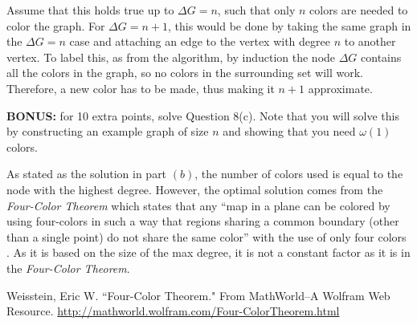 \documentclass[addpoints]{exam}
\begin{document}
\begin{questions}
\begin{solution}
Assume that this holds true up to $\Delta G = n$, such that only $n$ colors are needed to color the graph. For $\Delta G  = n+1$, this would be done by taking the same graph in the $\Delta G = n$ case and attaching an edge to the vertex with degree $n$ to another vertex. To label this, as from the algorithm, by induction the node $\Delta G$ contains all the colors in the graph, so no colors in the surrounding set will work. Therefore, a new color has to be made, thus making it $n+1$ approximate.


\end{solution}


\textbf{BONUS:} for 10 extra points, solve Question 8(c). Note that you will
solve this by constructing an example graph of size $n$ and showing that you
need $\omega(1)$ colors. 

\begin{solution}
As stated as the solution in part $(b)$, the number of colors used is equal to the node with the highest degree. However, the optimal solution comes from the {\em Four-Color Theorem} which states that any ``map in a plane can be colored by using four-colors in such a way that regions sharing a common boundary (other than a single point) do not share the same color'' with the use of only four colors \cite{wolfram}. As it is based on the size of the max degree, it is not a constant factor as it is in the {\em Four-Color Theorem}.
\end{solution}


\end{questions}


\begin{thebibliography}{99}
 Weisstein, Eric W. ``Four-Color Theorem." From MathWorld--A Wolfram Web Resource. \url{http://mathworld.wolfram.com/Four-ColorTheorem.html}
\end{thebibliography}
\end{document}
